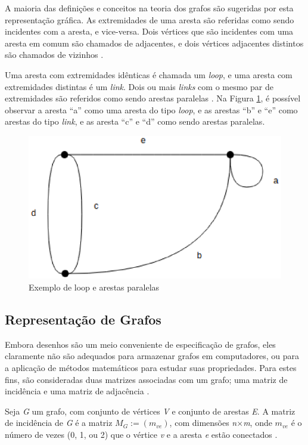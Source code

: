 A maioria das definições e conceitos na teoria dos grafos são sugeridas por esta representação gráfica. As extremidades de uma aresta são referidas como sendo incidentes com a aresta, e vice-versa. Dois vértices que são incidentes com uma aresta em comum são chamados de adjacentes, e dois vértices adjacentes distintos são chamados de vizinhos \cite{Costa:2011}.

Uma aresta com extremidades idênticas é chamada um \textit{loop}, e uma aresta com extremidades distintas é um \textit{link}. Dois ou mais \textit{links} com o mesmo par de extremidades são referidos como sendo arestas paralelas \cite{Bondy:2007}. Na Figura \ref{loop_paralela}, é possível observar a aresta ``a'' como uma aresta do tipo \textit{loop}, e as arestas ``b'' e ``e'' como arestas do tipo \textit{link}, e as aresta ``c'' e ``d'' como sendo arestas paralelas.

\begin{figure}[!h]
	\centering
	\includegraphics[scale=0.4]{figuras/capitulo2/loop_paralela.eps}
	\caption{Exemplo de loop e arestas paralelas}
	\label{loop_paralela}
\end{figure}

\subsection{Representação de Grafos}

Embora desenhos são um meio conveniente de especificação de grafos, eles claramente não são adequados para armazenar grafos em computadores, ou para a aplicação de métodos matemáticos para estudar suas propriedades. Para estes fins, são consideradas duas matrizes associadas com um grafo; uma matriz de incidência e uma matriz de adjacência \cite{Bondy:2007}.

Seja \textit{G} um grafo, com conjunto de vértices \textit{V} e conjunto de arestas \textit{E}. A matriz de incidência de \textit{G} é a matriz $M_G:= (m_{ve})$, com dimensões \textit{n$\times$m}, onde $m_{ve}$ é o número de vezes (0, 1, ou 2) que o vértice \textit{v} e a aresta \textit{e} estão conectados \cite{Bondy:2007}.

